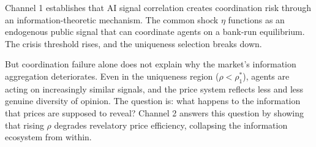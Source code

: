 Channel 1 establishes that AI signal correlation creates coordination risk through an information-theoretic mechanism. The common shock $\eta$ functions as an endogenous public signal that can coordinate agents on a bank-run equilibrium. The crisis threshold rises, and the uniqueness selection breaks down.

But coordination failure alone does not explain why the market's information aggregation deteriorates. Even in the uniqueness region ($\rho < \rho_1^*$), agents are acting on increasingly similar signals, and the price system reflects less and less genuine diversity of opinion. The question is: what happens to the information that prices are supposed to reveal? Channel 2 answers this question by showing that rising $\rho$ degrades revelatory price efficiency, collapsing the information ecosystem from within.
